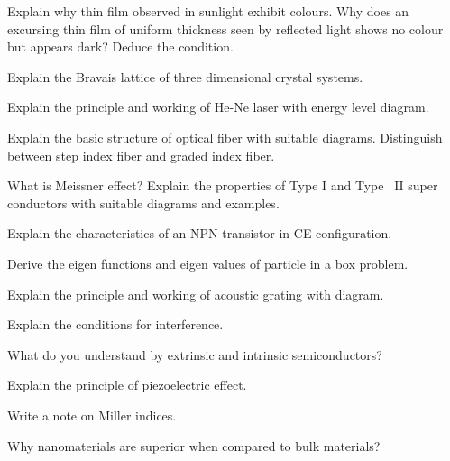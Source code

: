 \markB

\newpage \again

\partCo

\item \iitem Explain why thin film observed in sunlight exhibit colours. Why
  does an excursing thin film of uniform thickness seen by reflected light
  shows no colour but appears dark? Deduce the condition.
\Or
\item Explain the Bravais lattice of three dimensional crystal systems.
\ene

\item \iitem Explain the principle and working of He-Ne laser with energy level
  diagram.
\Or
\item Explain the basic structure of optical fiber with suitable diagrams.
  Distinguish between step index fiber and graded index fiber.
\ene

\item \iitem What is Meissner effect? Explain the properties of Type I and Type \
  II super conductors with suitable diagrams and examples.
\Or
\item Explain the characteristics of an NPN transistor in CE configuration.
\ene

\item \iitem Derive the eigen functions and eigen values of particle in
  a box problem.
\Or
\item Explain the principle and working of acoustic grating with diagram.
\ene

\markC
\ene

\newpage

\sub{\subj}
\maxtime

\partA

\iitem Explain the conditions for interference.
\item What do you understand by extrinsic and intrinsic semiconductors?
\item Explain the principle of piezoelectric effect.
\item Write a note on Miller indices.
\item Why nanomaterials are superior when compared to bulk materials?

\markA
\partB


